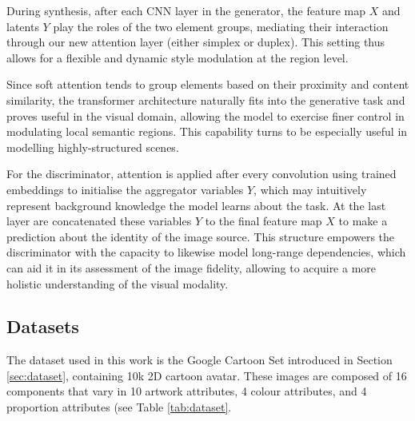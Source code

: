 \documentclass{article}
\begin{document}
	During synthesis, after each CNN layer in the generator, the feature map $X$ and latents $Y$ play 
	the roles of the two element groups, mediating their interaction through our new attention layer 
	(either simplex or duplex). 
	This setting thus allows for a flexible and dynamic style modulation at the region level. 
	
	Since soft attention tends to group elements based on their proximity and content similarity, the 
	transformer architecture naturally fits into the generative task and proves useful in the visual 
	domain, allowing the model to exercise finer control in modulating local semantic regions. This 
	capability turns to be especially useful in modelling highly-structured scenes.
	
	For the discriminator, attention is applied after every convolution using trained embeddings to 
	initialise the aggregator variables $Y$, which may intuitively represent background knowledge the 
	model learns about the task. At the last layer are concatenated these variables $Y$ to the final 
	feature map $X$ to make a prediction about the identity of the image source. 
	This structure empowers the discriminator with the capacity to likewise model long-range 
	dependencies, which can aid it in its assessment of the image fidelity, allowing to acquire a more 
	holistic understanding of the visual modality.
	
	\subsection{Datasets} \label{subsec:app_dataset}
	The dataset used in this work is the Google Cartoon Set \cite{cartoonset} introduced in Section 
	\ref{sec:dataset}, containing 10k 2D cartoon avatar. These images are composed of 16 components 
	that vary in 10 artwork attributes, 4 colour attributes, and 4 proportion attributes (see Table 
	\ref{tab:dataset}. 
		
\end{document}
